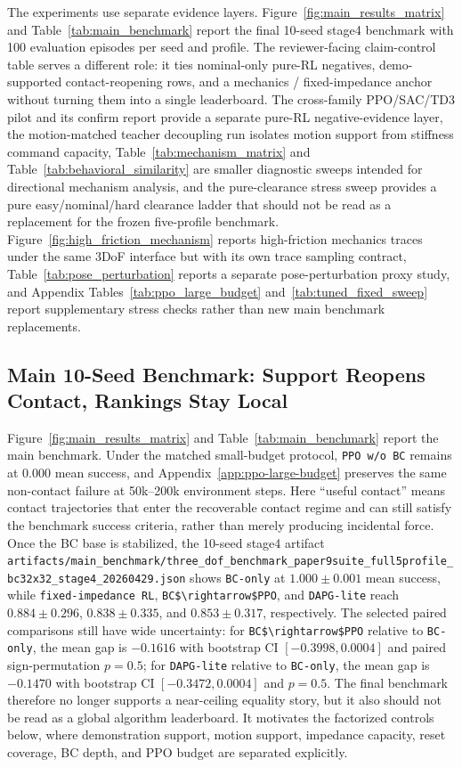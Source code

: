 ﻿\documentclass[11pt]{article}
\newcommand{\code}[1]{\nolinkurl{#1}}
\begin{document}
The experiments use separate evidence layers. Figure~\ref{fig:main_results_matrix} and
Table~\ref{tab:main_benchmark} report the final 10-seed stage4 benchmark with 100 evaluation
episodes per seed and profile. The reviewer-facing claim-control table serves a different role: it
ties nominal-only pure-RL negatives, demo-supported contact-reopening rows, and a mechanics /
fixed-impedance anchor without turning them into a single leaderboard. The cross-family PPO/SAC/TD3
pilot and its confirm report provide a separate pure-RL negative-evidence layer, the
motion-matched teacher decoupling run isolates motion support from stiffness command capacity,
Table~\ref{tab:mechanism_matrix} and Table~\ref{tab:behavioral_similarity} are smaller diagnostic
sweeps intended for directional mechanism analysis, and the pure-clearance stress sweep provides a
pure easy/nominal/hard clearance ladder that should not be read as a replacement for the frozen
five-profile benchmark. Figure~\ref{fig:high_friction_mechanism} reports high-friction mechanics
traces under the same 3DoF interface but with its own trace sampling contract,
Table~\ref{tab:pose_perturbation} reports a separate pose-perturbation proxy study, and Appendix
Tables~\ref{tab:ppo_large_budget} and~\ref{tab:tuned_fixed_sweep} report supplementary stress
checks rather than new main benchmark replacements.

\subsection{Main 10-Seed Benchmark: Support Reopens Contact, Rankings Stay Local}

Figure~\ref{fig:main_results_matrix} and Table~\ref{tab:main_benchmark} report the main
benchmark. Under the matched small-budget protocol, \code{PPO w/o BC} remains at 0.000 mean
success, and Appendix~\ref{app:ppo-large-budget} preserves the same non-contact failure at
50k--200k environment steps. Here ``useful contact'' means contact trajectories that enter the
recoverable contact regime and can still satisfy the benchmark success criteria, rather than merely
producing incidental force. Once the BC base is stabilized, the 10-seed stage4 artifact
\code{artifacts/main\_benchmark/three\_dof\_benchmark\_paper9suite\_full5profile\_bc32x32\_stage4\_20260429.json}
shows \code{BC-only} at $1.000 \pm 0.001$ mean success, while \code{fixed-impedance RL},
\code{BC$\rightarrow$PPO}, and \code{DAPG-lite} reach $0.884 \pm 0.296$,
$0.838 \pm 0.335$, and $0.853 \pm 0.317$, respectively. The selected paired comparisons still have
wide uncertainty: for \code{BC$\rightarrow$PPO} relative to \code{BC-only}, the mean gap is
$-0.1616$ with bootstrap CI $[-0.3998, 0.0004]$ and paired sign-permutation $p=0.5$; for
\code{DAPG-lite} relative to \code{BC-only}, the mean gap is $-0.1470$ with bootstrap CI
$[-0.3472, 0.0004]$ and $p=0.5$. The final benchmark therefore no longer supports a near-ceiling
equality story, but it also should not be read as a global algorithm leaderboard. It motivates the
factorized controls below, where demonstration support, motion support, impedance capacity, reset
coverage, BC depth, and PPO budget are separated explicitly.
\end{document}
